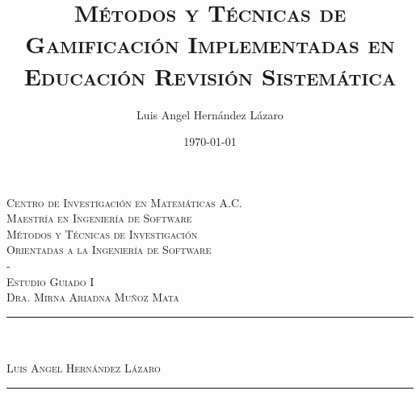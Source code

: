 \documentclass{report}
\title{\textsc{Métodos y Técnicas de Gamificación Implementadas en Educación Revisión Sistemática}}
\author{Luis Angel Hernández Lázaro}
\date{\today}
\makeatletter
\let\thetitle\@title
\makeatother
\begin{document}

\begin{titlepage}
	\centering
    \vspace*{0.5 cm}
    
    \begin{figure}
		\centering
	\end{figure}
    \textsc{\LARGE Centro de Investigación en Matemáticas A.C.}\\[1.0 cm]
	\textsc{\Large Maestría en Ingeniería de Software}\\[0.5 cm]
	\textsc{\large Métodos y Técnicas de Investigación \\ Orientadas a la Ingeniería de Software\\{-}\\Estudio Guiado I\\Dra. Mirna Ariadna Muñoz Mata}\\[0.5 cm]
	\rule{\linewidth}{0.2 mm} \\[0.4 cm]
	{ \huge \bfseries \thetitle}\\ \textsc{\large Luis Angel Hernández Lázaro}
	\rule{\linewidth}{0.2 mm} \\[1.5 cm]
	

\end{titlepage}
\end{document}
